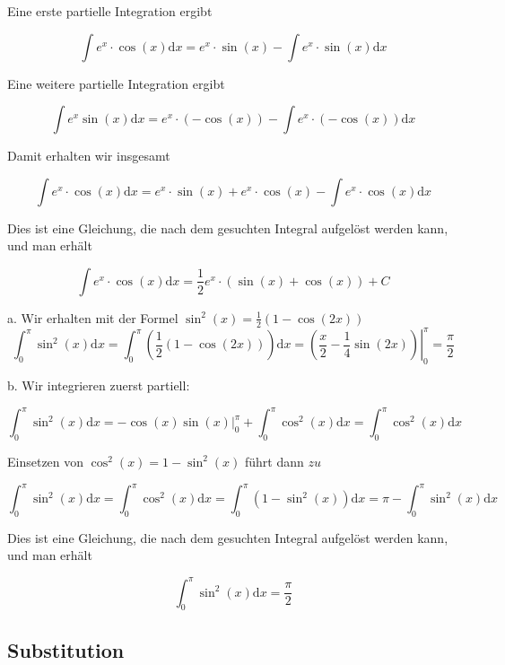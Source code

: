\begin{example}
    Eine erste partielle Integration ergibt

$$
\int e^{x} \cdot \cos (x) \mathrm{d} x=e^{x} \cdot \sin (x)-\int e^{x} \cdot \sin (x) \mathrm{d} x
$$

Eine weitere partielle Integration ergibt

$$
\int e^{x} \sin (x) \mathrm{d} x=e^{x} \cdot(-\cos (x))-\int e^{x} \cdot(-\cos (x)) \mathrm{d} x
$$

Damit erhalten wir insgesamt

$$
\int e^{x} \cdot \cos (x) \mathrm{d} x=e^{x} \cdot \sin (x)+e^{x} \cdot \cos (x)-\int e^{x} \cdot \cos (x) \mathrm{d} x
$$

Dies ist eine Gleichung, die nach dem gesuchten Integral aufgelöst werden kann, und man erhält

$$
\int e^{x} \cdot \cos (x) \mathrm{d} x=\frac{1}{2} e^{x} \cdot(\sin (x)+\cos (x))+C
$$

\end{example}

\begin{example}
    a. Wir erhalten mit der Formel $\sin ^{2}(x)=\frac{1}{2}(1-\cos (2 x))$
    $$
\int_{0}^{\pi} \sin ^{2}(x) \mathrm{d} x=\int_{0}^{\pi}\left(\frac{1}{2}(1-\cos (2 x))\right) \mathrm{d} x=\left.\left(\frac{x}{2}-\frac{1}{4} \sin (2 x)\right)\right|_{0} ^{\pi}=\frac{\pi}{2}
$$

b. Wir integrieren zuerst partiell:

$$
\int_{0}^{\pi} \sin ^{2}(x) \mathrm{d} x=-\left.\cos (x) \sin (x)\right|_{0} ^{\pi}+\int_{0}^{\pi} \cos ^{2}(x) \mathrm{d} x=\int_{0}^{\pi} \cos ^{2}(x) \mathrm{d} x
$$

Einsetzen von $\cos ^{2}(x)=1-\sin ^{2}(x)$ führt dann $z u$

$$
\int_{0}^{\pi} \sin ^{2}(x) \mathrm{d} x=\int_{0}^{\pi} \cos ^{2}(x) \mathrm{d} x=\int_{0}^{\pi}\left(1-\sin ^{2}(x)\right) \mathrm{d} x=\pi-\int_{0}^{\pi} \sin ^{2}(x) \mathrm{d} x
$$

Dies ist eine Gleichung, die nach dem gesuchten Integral aufgelöst werden kann, und man erhält

$$
\int_{0}^{\pi} \sin ^{2}(x) \mathrm{d} x=\frac{\pi}{2}
$$
\end{example}

\subsection*{Substitution}

